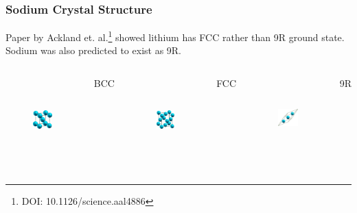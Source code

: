 \documentclass{beamer}
\begin{document}
\begin{frame}
	\frametitle{Sodium Crystal Structure}
	\begin{center}Paper by Ackland et. al.\footnote{DOI: 10.1126/science.aal4886
	} showed lithium has FCC rather than 9R ground state.
Sodium was also predicted to exist as 9R.\end{center}
	\begin{columns}
	\begin{figure}[ht]
	\begin{center}
		\includegraphics[height=1.3in]{nabcccrystal.png}
	\end{center}
	\end{figure}
	\begin{center}
		BCC
	\end{center}
	\begin{figure}[ht]
	\begin{center}
		\includegraphics[height=1.3in]{nafcccrystal.png}
	\end{center}
	\end{figure}
	\begin{center}
		FCC
	\end{center}
	\begin{figure}[ht]
	\begin{center}
		\includegraphics[height=1.23in]{na9rcrystal.png}
	\end{center}
	\end{figure}
	\begin{center}
		9R
	\end{center}
\end{columns}
\end{frame}
\end{document}
